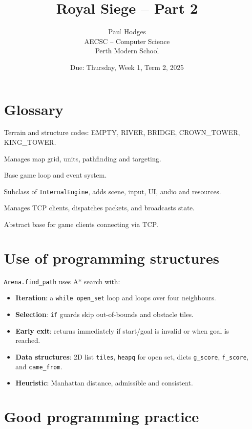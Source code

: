 \documentclass[11pt,a4paper]{article}
\title{\bfseries Royal Siege – Part 2}
\author{Paul Hodges\\\small AECSC – Computer Science\\\small Perth Modern School}
\date{Due: Thursday, Week 1, Term 2, 2025}
\begin{document}
\maketitle
\thispagestyle{empty}

\newpage
\tableofcontents
\newpage

\section*{Glossary}
\begin{description}[nosep]
  \item[TileType] Terrain and structure codes: EMPTY, RIVER, BRIDGE, CROWN\_TOWER, KING\_TOWER.
  \item[Arena] Manages map grid, units, pathfinding and targeting.
  \item[InternalEngine] Base game loop and event system.
  \item[Engine] Subclass of \texttt{InternalEngine}, adds scene, input, UI, audio and resources. 
  \item[Server] Manages TCP clients, dispatches packets, and broadcasts state. 
  \item[Client] Abstract base for game clients connecting via TCP. 
\end{description}

\section{Use of programming structures}
\texttt{Arena.find\_path} uses A* search with:
\begin{itemize}[nosep]
  \item \textbf{Iteration}: a \texttt{while open\_set} loop and loops over four neighbours.
  \item \textbf{Selection}: \texttt{if} guards skip out-of-bounds and obstacle tiles.
  \item \textbf{Early exit}: returns immediately if start/goal is invalid or when goal is reached.
  \item \textbf{Data structures}: 2D list \texttt{tiles}, \texttt{heapq} for open set, dicts \texttt{g\_score}, \texttt{f\_score}, and \texttt{came\_from}.
  \item \textbf{Heuristic}: Manhattan distance, admissible and consistent.
\end{itemize}

\section{Good programming practice}
\end{document}
